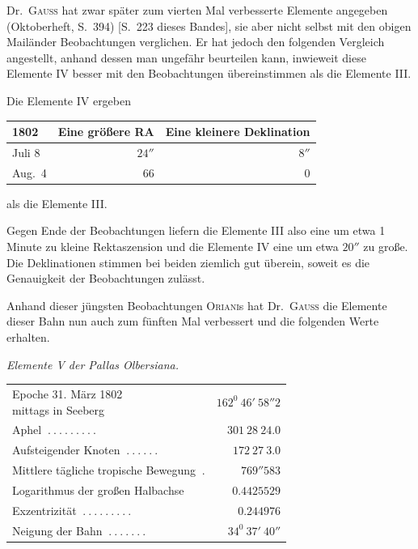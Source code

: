 Dr.\ \textsc{Gauß} hat zwar später zum vierten Mal verbesserte Elemente angegeben (Oktoberheft, S.\ 394) [S.\ 223 dieses Bandes], sie aber nicht selbst mit den obigen Mailänder Beobachtungen verglichen. Er hat jedoch den folgenden Vergleich angestellt, anhand dessen man ungefähr beurteilen kann, inwieweit diese Elemente IV besser mit den Beobachtungen übereinstimmen als die Elemente III.
\begin{center}
Die Elemente IV ergeben\par\medskip
\begin{tabular}{l|r|r}
1802&Eine größere RA&Eine kleinere Deklination\\\hline
Juli 8&$24''$&$8''$\\
Aug.\ 4&$66$&$0$
\end{tabular}\par\medskip
als die Elemente III.
\end{center}

Gegen Ende der Beobachtungen liefern die Elemente III also eine um etwa 1 Minute zu kleine Rektaszension und die Elemente IV eine um etwa $20''$ zu große. Die Deklinationen stimmen bei beiden ziemlich gut überein, soweit es die Genauigkeit der Beobachtungen zulässt.

Anhand dieser jüngsten Beobachtungen \textsc{Oriani}s hat Dr.\ \textsc{Gauß} die Elemente dieser Bahn nun auch zum fünften Mal verbessert und die folgenden Werte erhalten.
\begin{center}\textit{Elemente V der Pallas Olbersiana.}\end{center}
\begin{center}
\begingroup\small\setlength{\tabcolsep}{3pt}
\begin{tabular}{l r}
\shortstack[l]{Epoche 31. März 1802\\mittags in Seeberg}&$162^0\ 46'\ 58''2$\\
Aphel $\ .\ .\ .\ .\ .\ .\ .\ .\ .$&$301\ 28\ 24.0$\\
Aufsteigender Knoten $\ .\ .\ .\ .\ .\ .$&$172\ 27\ 3.0$\\
Mittlere tägliche tropische Bewegung $\ .$&$769''583$\\[3pt]
Logarithmus der großen Halbachse&$0.4425529$\\
Exzentrizität $\ .\ .\ .\ .\ .\ .\ .\ .\ .$&$0.244976$\\
Neigung der Bahn $\ .\ .\ .\ .\ .\ .\ .$&$34^0\ 37'\ 40''$
\end{tabular}\endgroup
\end{center}

